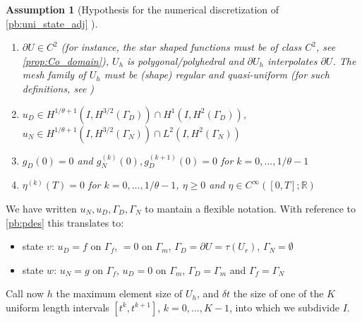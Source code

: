 \documentclass[english,a4paper,9pt,oneside]{scrbook}	%
\theoremstyle{break}
\newtheorem{ass}[equation]{Assumption}
\theoremstyle{remark}
\newcommand{\mR}{\mathbb{R}}
\begin{document}
\begin{ass}[Hypothesis for the numerical discretization of \cref{pb:uni_state_adj} ]
\label{ass:num_discr_shopt}
\textcolor{white}{ }
\begin{enumerate}
	\item $\partial U \in C^2$ (for instance, the star shaped functions must be of class $C^2$, see \cref{prop:Co_domain}), $U_h$ is polygonal/polyhedral and $\partial U_h$ interpolates $\partial U$. The mesh family of $U_h$ must be (shape) regular and quasi-uniform (for such definitions, see \cite{brenner_scott})
	\item $u_D \in  H^{1/\theta+1}(I,H^{3/2}(\Gamma_D)) \cap H^1(I, H^{2}(\Gamma_D))$, $u_N \in  H^{1/\theta+1}(I, H^{3/2}(\Gamma_N)) \cap L^2(I, H^{2}(\Gamma_N))$
	\item $g_D(0)=0$ and $g_N^{(k)}(0), g_D^{(k+1)}(0)  = 0$ for $k=0,..., 1/\theta-1$
	\item $\eta^{(k)}(T)  = 0$ for $k=0,..., 1/\theta-1$, $\eta \geq 0$ and $\eta \in C^{\infty}([0,T];\mR)$
\end{enumerate}

\end{ass}

We have written $u_N, u_D, \Gamma_D, \Gamma_N$ to mantain a flexible notation. With reference to \cref{pb:pdes} this translates to:

\begin{itemize}
	\item state $v$: $u_D=f$ on $\Gamma_f$, $=0$ on $\Gamma_m$, $\Gamma_D = \partial U=\tau(U_r)$, $\Gamma_N=\emptyset$
	\item state $w$: $u_N=g$ on $\Gamma_f$, $u_D = 0$ on $\Gamma_m$, $\Gamma_D = \Gamma_m$ and $\Gamma_f = \Gamma_N$
\end{itemize}

Call now $h$ the maximum element size of $U_h$, and $\delta t$ the size of one of the $K$ uniform length intervals $[t^k,t^{k+1}]$, $k=0,...,K-1$, into which we subdivide $I$.
\end{document}
